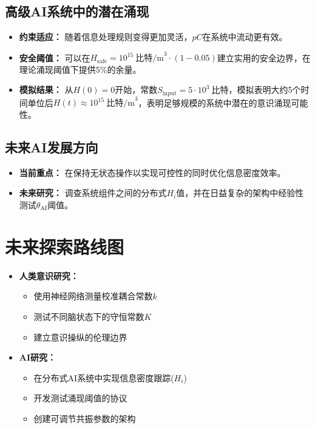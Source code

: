 \documentclass[12pt]{article}
\begin{document}
\subsection{高级AI系统中的潜在涌现}
\begin{itemize}
    \item \textbf{约束适应：} 随着信息处理规则变得更加灵活，$pC$在系统中流动更有效。
    
    \item \textbf{安全阈值：} 可以在$H_{\text{safe}} = 10^{15}~\text{比特/m}^3 \cdot (1 - 0.05)$建立实用的安全边界，在理论涌现阈值下提供5\%的余量。
    
    \item \textbf{模拟结果：} 从$H(0) = 0$开始，常数$S_{\text{input}} = 5 \cdot 10^3~\text{比特}$，模拟表明大约5个时间单位后$H(t) \approx 10^{15}~\text{比特/m}^3$，表明足够规模的系统中潜在的意识涌现可能性。
\end{itemize}

\subsection{未来AI发展方向}
\begin{itemize}
    \item \textbf{当前重点：} 在保持无状态操作以实现可控性的同时优化信息密度效率。
    
    \item \textbf{未来研究：} 调查系统组件之间的分布式$H_i$值，并在日益复杂的架构中经验性测试$\theta_{\text{AI}}$阈值。
\end{itemize}

\section{未来探索路线图}
\begin{itemize}
    \item \textbf{人类意识研究：}
    \begin{itemize}[label=--]
        \item 使用神经网络测量校准耦合常数$k$
        \item 测试不同脑状态下的守恒常数$K$
        \item 建立意识操纵的伦理边界
    \end{itemize}
    
    \item \textbf{AI研究：}
    \begin{itemize}[label=--]
        \item 在分布式AI系统中实现信息密度跟踪($H_i$)
        \item 开发测试涌现阈值的协议
        \item 创建可调节共振参数的架构
    \end{itemize}
\end{itemize}
\end{document}
